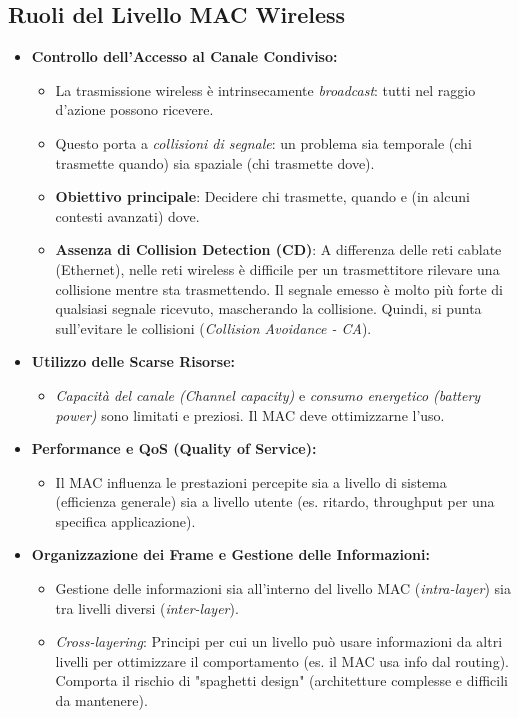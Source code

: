 \subsection{Ruoli del Livello MAC Wireless}
\begin{itemize}
    \item \textbf{Controllo dell'Accesso al Canale Condiviso:}
    \begin{itemize}
        \item La trasmissione wireless è intrinsecamente \textit{broadcast}: tutti nel raggio d'azione possono ricevere.
        \item Questo porta a \textit{collisioni di segnale}: un problema sia temporale (chi trasmette quando) sia spaziale (chi trasmette dove).
        \item \textbf{Obiettivo principale}: Decidere chi trasmette, quando e (in alcuni contesti avanzati) dove.
        \item \textbf{Assenza di Collision Detection (CD)}: A differenza delle reti cablate (Ethernet), nelle reti wireless è difficile per un trasmettitore rilevare una collisione mentre sta trasmettendo. Il segnale emesso è molto più forte di qualsiasi segnale ricevuto, mascherando la collisione. Quindi, si punta sull'evitare le collisioni (\textit{Collision Avoidance - CA}).
    \end{itemize}
    \item \textbf{Utilizzo delle Scarse Risorse:}
    \begin{itemize}
        \item \textit{Capacità del canale (Channel capacity)} e \textit{consumo energetico (battery power)} sono limitati e preziosi. Il MAC deve ottimizzarne l'uso.
    \end{itemize}
    \item \textbf{Performance e QoS (Quality of Service):}
    \begin{itemize}
        \item Il MAC influenza le prestazioni percepite sia a livello di sistema (efficienza generale) sia a livello utente (es. ritardo, throughput per una specifica applicazione).
    \end{itemize}
    \item \textbf{Organizzazione dei Frame e Gestione delle Informazioni:}
    \begin{itemize}
        \item Gestione delle informazioni sia all'interno del livello MAC (\textit{intra-layer}) sia tra livelli diversi (\textit{inter-layer}).
        \item \textit{Cross-layering}: Principi per cui un livello può usare informazioni da altri livelli per ottimizzare il comportamento (es. il MAC usa info dal routing). Comporta il rischio di "spaghetti design" (architetture complesse e difficili da mantenere).
    \end{itemize}
\end{itemize}

